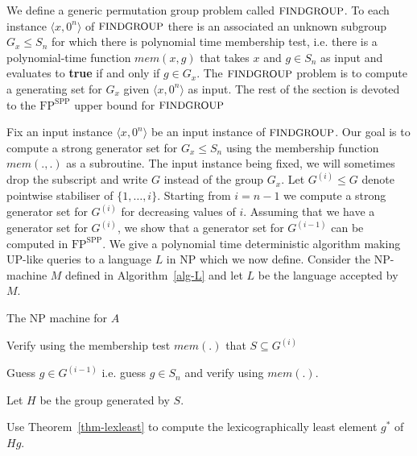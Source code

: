 \documentclass[11pt]{madras}%
\theoremstyle{remark}
\newcommand{\ProblemFont}[1]{{\ensuremath{\textrm{\small #1}}}}
\begin{document}
We define a generic permutation group problem called
$\ProblemFont{FINDGROUP}$. To each instance $\langle x,0^n \rangle$ of
$\ProblemFont{FINDGROUP}$ there is an associated an unknown subgroup
$G_x\leq S_n$ for which there is polynomial time membership test, i.e.
there is a polynomial-time function $mem(x,g)$ that takes $x$ and
$g\in S_n$ as input and evaluates to {\bf true} if and only if $g\in
G_x$.  The $\ProblemFont{FINDGROUP}$ problem is to compute a
generating set for $G_x$ given $\langle x,0^n \rangle$ as input.  The
rest of the section is devoted to the $\mathrm{FP}^{\mathrm{SPP}}$
upper bound for $\ProblemFont{FINDGROUP}$

Fix an input instance $\langle{x,0^n}\rangle$ be an input instance of
$\ProblemFont{FINDGROUP}$. Our goal is to compute a strong generator
set for $G_x\leq S_n$ using the membership function $mem(.,.)$ as a
subroutine. The input instance being fixed, we will sometimes drop the
subscript and write $G$ instead of the group $G_x$.  Let $G^{(i)} \leq
G$ denote pointwise stabiliser of $\{ 1,\ldots,i \}$. Starting from $i
= n-1$ we compute a strong generator set for $G^{(i)}$ for decreasing
values of $i$. Assuming that we have a generator set for $G^{(i)}$, we
show that a generator set for $G^{(i-1)}$ can be computed in
$\mathrm{FP}^{\mathrm{SPP}}$. We give a polynomial time deterministic
algorithm making $\mathrm{UP}$-like queries to a language $L$ in
$\mathrm{NP}$ which we now define.  Consider the $\mathrm{NP}$-machine
$M$ defined in Algorithm~\ref{alg-L} and let $L$ be the language
accepted by $M$.

\begin{algorithm}
  \caption{The $\mathrm{NP}$ machine for $A$}\label{alg-L}



  Verify using the membership test $mem(.)$ that $S \subseteq G^{(i)}$

  Guess $g \in G^{(i-1)}$ i.e. guess $g \in S_n$ and verify using
  $mem(.)$.

  Let $H$ be the group generated by $S$.

  Use Theorem~\ref{thm-lexleast} to compute the lexicographically
  least element $g^*$ of $Hg$.


  
\end{algorithm}
\end{document}
